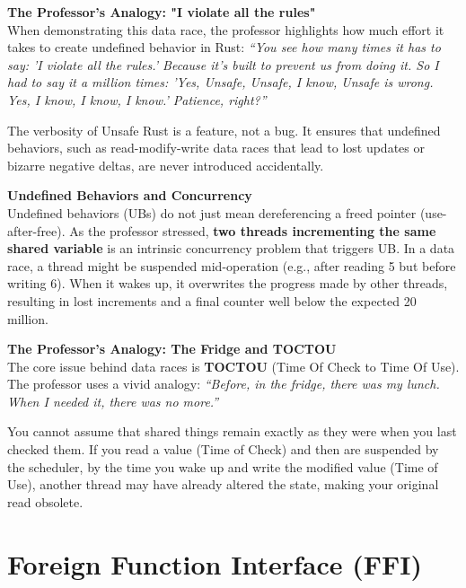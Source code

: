 \begin{insightbox}
\textbf{The Professor's Analogy: "I violate all the rules"}\\
When demonstrating this data race, the professor highlights how much effort it takes to create undefined behavior in Rust: \textit{``You see how many times it has to say: 'I violate all the rules.' Because it's built to prevent us from doing it. So I had to say it a million times: 'Yes, Unsafe, Unsafe, I know, Unsafe is wrong. Yes, I know, I know, I know.' Patience, right?''}

The verbosity of Unsafe Rust is a feature, not a bug. It ensures that undefined behaviors, such as read-modify-write data races that lead to lost updates or bizarre negative deltas, are never introduced accidentally.
\end{insightbox}

\begin{warningbox}
\textbf{Undefined Behaviors and Concurrency}\\
Undefined behaviors (UBs) do not just mean dereferencing a freed pointer (use-after-free). As the professor stressed, \textbf{two threads incrementing the same shared variable} is an intrinsic concurrency problem that triggers UB. In a data race, a thread might be suspended mid-operation (e.g., after reading 5 but before writing 6). When it wakes up, it overwrites the progress made by other threads, resulting in lost increments and a final counter well below the expected 20 million.
\end{warningbox}

\begin{insightbox}
\textbf{The Professor's Analogy: The Fridge and TOCTOU}\\
The core issue behind data races is \textbf{TOCTOU} (Time Of Check to Time Of Use). The professor uses a vivid analogy: \textit{``Before, in the fridge, there was my lunch. When I needed it, there was no more.''} 

You cannot assume that shared things remain exactly as they were when you last checked them. If you read a value (Time of Check) and then are suspended by the scheduler, by the time you wake up and write the modified value (Time of Use), another thread may have already altered the state, making your original read obsolete.
\end{insightbox}

\section{Foreign Function Interface (FFI)}

